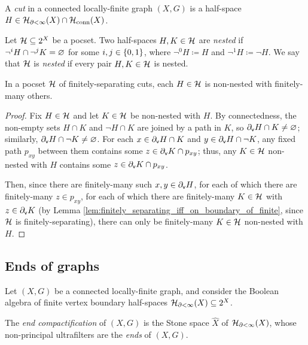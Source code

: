 \documentclass[reqno]{amsart}
\begin{document}
    \begin{definition}
        A \textit{cut} in a connected locally-finite graph $(X,G)$ is a half-space $H\in\mc{H}_{\del<\infty}(X)\cap\mc{H}_\mathrm{conn}(X)$.
    \end{definition}

    \begin{definition}\label{def:nested}
        Let $\mc{H}\subseteq2^X$ be a pocset. Two half-spaces $H,K\in\mc{H}$ are \textit{nested} if $\lnot^iH\cap\lnot^jK=\em$ for some $i,j\in\l\{0,1\r\}$, where $\lnot^0H\coloneqq H$ and $\lnot^1H\coloneqq\lnot H$. We say that $\mc{H}$ is \textit{nested} if every pair $H,K\in\mc{H}$ is nested.
    \end{definition}

    \begin{lemma}\label{lem:connected_cuts_non_nested_finitely_others}
        In a pocset $\mc{H}$ of finitely-separating cuts, each $H\in\mc{H}$ is non-nested with finitely-many others.
    \end{lemma}
    \begin{proof}
        Fix $H\in\mc{H}$ and let $K\in\mc{H}$ be non-nested with $H$. By connectedness, the non-empty sets $H\cap K$ and $\lnot H\cap K$ are joined by a path in $K$, so $\del_\mathsf{v}H\cap K\neq\em$; similarly, $\del_\mathsf{v}H\cap\lnot K\neq\em$. For each $x\in\del_\mathsf{v}H\cap K$ and $y\in\del_\mathsf{v}H\cap\lnot K$, any fixed path $p_{xy}$ between them contains some $z\in\del_\mathsf{v}K\cap p_{xy}$; thus, any $K\in\mc{H}$ non-nested with $H$ contains some $z\in\del_\mathsf{v}K\cap p_{xy}$.

        Then, since there are finitely-many such $x,y\in\del_\mathsf{v}H$, for each of which there are finitely-many $z\in p_{xy}$, for each of which there are finitely-many $K\in\mc{H}$ with $z\in\del_\mathsf{v}K$ (by Lemma \ref{lem:finitely_separating_iff_on_boundary_of_finite}, since $\mc{H}$ is finitely-separating), there can only be finitely-many $K\in\mc{H}$ non-nested with $H$.
    \end{proof}

    \subsection{Ends of graphs}

    Let $(X,G)$ be a connected locally-finite graph, and consider the Boolean algebra of finite vertex boundary half-spaces $\mc{H}_{\del<\infty}(X)\subseteq2^X$.

    \begin{definition}
        The \textit{end compactification} of $(X,G)$ is the Stone space $\widehat{X}$ of $\mc{H}_{\del<\infty}(X)$, whose non-principal ultrafilters are the \textit{ends} of $(X,G)$.
    \end{definition}
\end{document}
